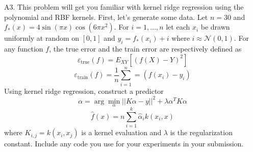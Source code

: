 \documentclass{article}
\newcommand{\argmin}{\arg\!\min}
\newcommand{\1}{\mathbf{1}}
\newcommand{\N}{\mathcal{N}} %
\begin{document}
\newpage
A3. This problem will get you familiar with kernel ridge regression using the polynomial and RBF kernels. First, let’s generate some data. Let $n=30$ and $f_*(x)=4\sin(\pi x)\cos(6\pi x^2)$. For $i= 1,\hdots,n$ let each $x_i$ be drawn uniformly at random on $[0,1]$ and $y_i=f_*(x_i) + i$ where $i\approx\N(0,1)$. For any function $f$, the true error and the train error are respectively defined as 
$$\varepsilon_{\text{true}} (f) = E_{XY} [(f(X)-Y)^2]$$
$$\varepsilon_{\text{train}} (f) =\frac{1}{n}\sum_{i=1}^n = (f(x_i) - y_i)$$
Using kernel ridge regression, construct a predictor 
$$\alpha = \argmin_\alpha ||K\alpha - y||^2 + \lambda\alpha^TK\alpha$$
$$\hat f(x) = n\sum_{i=1}^k \widehat\alpha_i k(x_i,x)$$
where $K_{i,j}=k(x_i,x_j)$ is a kernel evaluation and $\lambda$ is the regularization constant. Include any code you use for your experiments in your submission.
\end{document}
